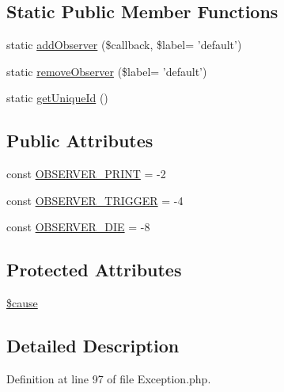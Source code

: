\subsection*{Static Public Member Functions}
\begin{DoxyCompactItemize}
\item 
static \hyperlink{classPEAR__Exception_a02492e33d5af1e70e864d4269f6c5358}{add\-Observer} (\$callback, \$label= 'default')
\item 
static \hyperlink{classPEAR__Exception_af5655bcf96398482199620196db0f8cb}{remove\-Observer} (\$label= 'default')
\item 
static \hyperlink{classPEAR__Exception_af81b4e556fe7142e45ed9117b8cfb044}{get\-Unique\-Id} ()
\end{DoxyCompactItemize}
\subsection*{Public Attributes}
\begin{DoxyCompactItemize}
\item 
const \hyperlink{classPEAR__Exception_afaa71d35f3fab453da2cef325b210423}{O\-B\-S\-E\-R\-V\-E\-R\-\_\-\-P\-R\-I\-N\-T} = -\/2
\item 
const \hyperlink{classPEAR__Exception_a0bf6d43a80c7f3bc2c7cfae062ff4477}{O\-B\-S\-E\-R\-V\-E\-R\-\_\-\-T\-R\-I\-G\-G\-E\-R} = -\/4
\item 
const \hyperlink{classPEAR__Exception_ad3ee7214450c1e14de99dbde12b8a60c}{O\-B\-S\-E\-R\-V\-E\-R\-\_\-\-D\-I\-E} = -\/8
\end{DoxyCompactItemize}
\subsection*{Protected Attributes}
\begin{DoxyCompactItemize}
\item 
\hyperlink{classPEAR__Exception_a7570906af734c282bcde649449bdbfdb}{\$cause}
\end{DoxyCompactItemize}


\subsection{Detailed Description}


Definition at line 97 of file Exception.\-php.



